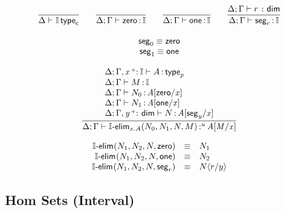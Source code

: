 \documentclass[11pt]{article}
\theoremstyle{plain}
\begin{document}
\[
\begin{array}{c}
\infer{\wftpcc{\Delta}{\I}}
      {}
\qquad
\infer{\oftpc{\Delta}{\Gamma}{\Iz}{\I}}{}
\qquad
\infer{\oftpc{\Delta}{\Gamma}{\Io}{\I}}{}
\qquad
\infer{\oftpc{\Delta}{\Gamma}{\Iseg{r}}{\I}}{\wfdimc{\Delta}{\Gamma}{r}}
\\ \\
\Iseg{0} \deq \Iz \\
\Iseg{1} \deq \Io \\
\\
\infer{\voftpc{\Delta}{\Gamma}{\Ielim{x.A}{N_0}{N_1}{N}{M}}{u}{\subst{A}{M}{x}}}
      {\begin{array}{l}
          \wftpp{\Delta}{\Gamma,\vptptm{x}{\co}{\I}}{A} \\
          \oftpc{\Delta}{\Gamma}{M}{\I} \\
          \oftpp{\Delta}{\Gamma}{N_0}{\subst{A}{\Iz}{x}} \\
          \oftpp{\Delta}{\Gamma}{N_1}{\subst{A}{\Io}{x}} \\
          \oftpp{\Delta}{\Gamma,\vdimtm{y}{\co}}{N}{\subst{A}{\Iseg{y}}{x}}
        \end{array}
      }
\end{array}
\]


\[
\begin{array}{rcll}
\mathsf{\mathsf{{\mathbb{I}}}\text{-}elim}_{}(N_1,N_2,N,\mathsf{zero}) & \equiv & N_1 \\
\mathsf{\mathsf{{\mathbb{I}}}\text{-}elim}_{}(N_1,N_2,N,\mathsf{one}) & \equiv & N_2 \\
\mathsf{\mathsf{{\mathbb{I}}}\text{-}elim}_{}(N_1,N_2,N,\mathsf{seg}_{r}) & \equiv & N \langle r / y \rangle \\
\end{array} \\
\]

\subsection{Hom Sets (Interval)}
\end{document}
